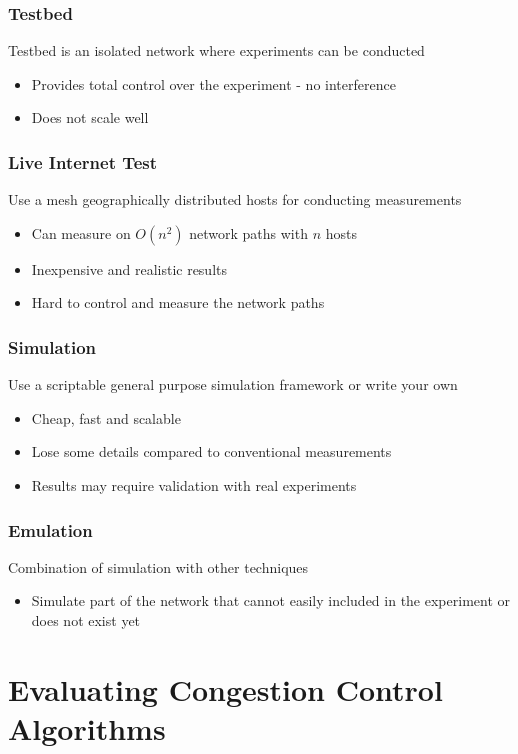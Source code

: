 \documentclass{beamer}
\begin{document}
\begin{frame}
\frametitle{Testbed}
Testbed is an isolated network where experiments can be conducted
\begin{itemize}
	\item Provides total control over the experiment - no interference
	\item Does not scale well
\end{itemize}

\end{frame}

\begin{frame}
\frametitle{Live Internet Test}
Use a mesh geographically distributed hosts for conducting measurements
\begin{itemize}
	\item Can measure on $O(n^2)$ network paths with $n$ hosts
	\item Inexpensive and realistic results
	\item Hard to control and measure the network paths 
\end{itemize}

\end{frame}

\begin{frame}
\frametitle{Simulation}
Use a scriptable general purpose simulation framework or write your own

\begin{itemize}
	\item Cheap, fast and scalable
	\item Lose some details compared to conventional measurements
	\item Results may require validation with real experiments
\end{itemize}

\end{frame}

\begin{frame}
\frametitle{Emulation}
Combination of simulation with other techniques
\begin{itemize}
	\item Simulate part of the network that cannot easily included in the experiment or does not exist yet
\end{itemize}

\end{frame}

\section{Evaluating Congestion Control Algorithms}
\end{document}
